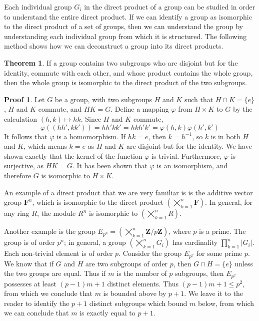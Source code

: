 \documentclass[12pt]{amsbook}
\theoremstyle{definition}
\newtheorem{theorem}{Theorem}[chapter]
\newtheorem*{prf}{Proof}
\newcommand{\bint}{\mathbf{Z}} %
\begin{document}
Each individual group $G_i$ in the direct product of a group can be studied in order to understand the entire direct product. If we can identify a group as isomorphic to the direct product of a set of groups, then we can understand the group by understanding each individual group from which it is structured. The following method shows how we can deconstruct a group into its direct products.

\begin{theorem}
    If a group contains two subgroups who are disjoint but for the identity, commute with each other, and whose product contains the whole group, then the whole group is isomorphic to the direct product of the two subgroups.
\end{theorem}
\begin{prf}
    Let $G$ be a group, with two subgroups $H$ and $K$ such that $H \cap K = \{e\}$, $H$ and $K$ commute, and $HK = G$. Define a mapping $\varphi$ from $H \times K$ to $G$ by the calculation $(h,k) \mapsto hk$. Since $H$ and $K$ commute,
    \[ \varphi((hh',kk')) = hh'kk' = hkh'k' = \varphi(h,k) \varphi(h',k') \]
    It follows that $\varphi$ is a homomorphism. If $hk = e$, then $k = h^{-1}$, so $k$ is in both $H$ and $K$, which means $k = e$ as $H$ and $K$ are disjoint but for the identity. We have shown exactly that the kernel of the function $\varphi$ is trivial. Furthermore, $\varphi$ is surjective, as $HK = G$. It has been shown that $\varphi$ is an isomorphism, and therefore $G$ is isomorphic to $H \times K$.
\end{prf}

An example of a direct product that we are very familiar is is the additive vector group $\mathbf{F}^n$, which is isomorphic to the direct product $(\bigtimes_{k = 1}^n \mathbf{F})$. In general, for any ring $R$, the module $R^n$ is isomorphic to $(\bigtimes_{k = 1}^n R)$.

Another example is the group $E_{p^n} = (\bigtimes_{k=1}^n \bint/p\bint)$, where $p$ is a prime. The group is of order $p^n$; in general, a group $(\bigtimes_{k=1}^n G_i)$ has cardinality $\prod_{k=1}^n |G_i|$. Each non-trivial element is of order $p$. Consider the group $E_{p^2}$ for some prime $p$. We know that if $G$ and $H$ are two subgroups of order $p$, then $G \cap H = \{e\}$ unless the two groups are equal. Thus if $m$ is the number of $p$ subgroups, then $E_{p^2}$ possesses at least $(p - 1)m + 1$ distinct elements. Thus $(p - 1)m + 1 \leq p^2$, from which we conclude that $m$ is bounded above by $p + 1$. We leave it to the reader to identify the $p + 1$ distinct subgroups which bound $m$ below, from which we can conclude that $m$ is exactly equal to $p + 1$.
\end{document}

